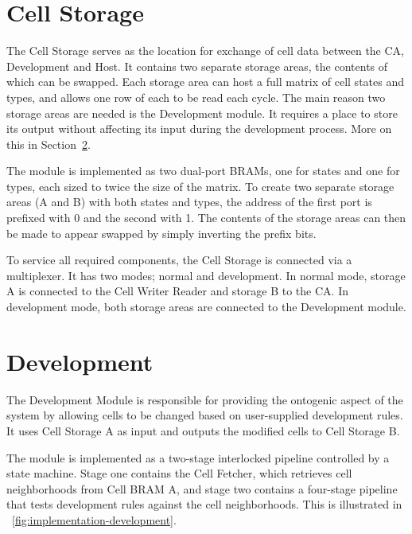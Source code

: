 
\section{Cell Storage}

The Cell Storage serves as the location for exchange of cell data between the CA, Development and Host.
It contains two separate storage areas, the contents of which can be swapped.
Each storage area can host a full matrix of cell states and types, and allows one row of each to be read each cycle.
The main reason two storage areas are needed is the Development module.
It requires a place to store its output without affecting its input during the development process.
More on this in Section~\ref{sec:development}.

The module is implemented as two dual-port BRAMs, one for states and one for types, each sized to twice the size of the matrix.
To create two separate storage areas (A and B) with both states and types, the address of the first port is prefixed with 0 and the second with 1.
The contents of the storage areas can then be made to appear swapped by simply inverting the prefix bits.

To service all required components, the Cell Storage is connected via a multiplexer.
It has two modes; normal and development.
In normal mode, storage A is connected to the Cell Writer Reader and storage B to the CA.
In development mode, both storage areas are connected to the Development module.



\section{Development}
\label{sec:development}

The Development Module is responsible for providing the ontogenic aspect of the system by allowing cells to be changed based on user-supplied development rules.
It uses Cell Storage A as input and outputs the modified cells to Cell Storage B.

The module is implemented as a two-stage interlocked pipeline controlled by a state machine.
Stage one contains the Cell Fetcher, which retrieves cell neighborhoods from Cell BRAM A, and stage two contains a four-stage pipeline that tests development rules against the cell neighborhoods.
This is illustrated in \figurename~\ref{fig:implementation-development}.

